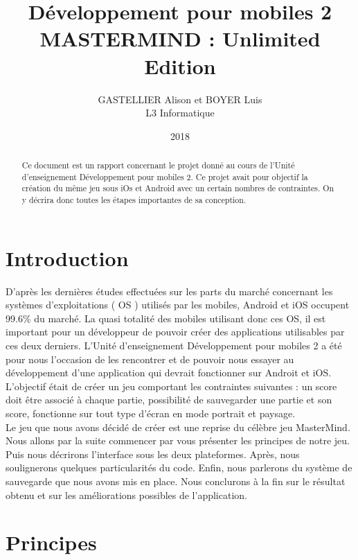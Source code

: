 \documentclass{article}
\title{D\'{e}veloppement pour mobiles 2 \\ MASTERMIND : Unlimited Edition }
\author{GASTELLIER Alison et BOYER Luis \\ L3 Informatique}
\date{2018}
\begin{document}
\maketitle

\begin{abstract}
Ce document est un rapport concernant le projet donn\'{e} au cours de l'Unit\'{e} d'enseignement D\'{e}veloppement pour mobiles 2. Ce projet avait pour objectif la cr\'{e}ation du m\^{e}me jeu sous iOs et Android avec un certain nombres de contraintes. On y d\'{e}crira donc toutes les \'{e}tapes importantes de sa conception.
\end{abstract}

\bigskip
\bigskip
\section{Introduction}

D'apr\`{e}s les derni\`{e}res \'{e}tudes effectu\'{e}es sur les parts du march\'{e} concernant les syst\`{e}mes d'exploitations ( OS ) utilis\'{e}s par les mobiles, Android et iOS occupent 99.6\% du march\'{e}. La quasi totalit\'{e} des mobiles utilisant donc ces OS, il est important pour un d\'{e}veloppeur de pouvoir cr\'{e}er des applications utilisables par ces deux derniers. L'Unit\'{e} d'enseignement D\'{e}veloppement pour mobiles 2 a \'{e}t\'{e} pour nous l'occasion de les rencontrer et de pouvoir nous essayer au d\'{e}veloppement d'une application qui devrait fonctionner sur Androit et iOS.
\\ \indent L'objectif \'{e}tait de cr\'{e}er un jeu comportant les contraintes suivantes : un score doit \^{e}tre associ\'{e} \`{a} chaque partie, possibilit\'{e} de sauvegarder une partie et son score, fonctionne sur tout type d'\'{e}cran en mode portrait et paysage. 
\\ \indent Le jeu que nous avons d\'{e}cid\'{e} de cr\'{e}er est une reprise du c\'{e}l\`{e}bre jeu MasterMind. Nous allons par la suite commencer par vous pr\'{e}senter les principes de notre jeu. Puis nous d\'{e}crirons l'interface sous les deux plateformes. Apr\`{e}s, nous soulignerons quelques particularit\'{e}s du code. Enfin, nous parlerons du syst\`{e}me de sauvegarde que nous avons mis en place. Nous conclurons \`{a} la fin sur le r\'{e}sultat obtenu et sur les am\'{e}liorations possibles de l'application.


\section{Principes}
\end{document}
